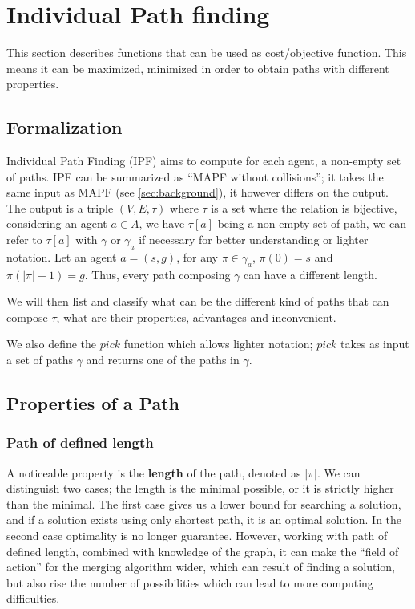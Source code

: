 
\section{Individual Path finding}\label{sec:ipf}
This section describes functions that can be used as cost/objective function. This means it can be maximized, minimized in order to obtain paths with different properties.

\subsection{Formalization}

Individual Path Finding (IPF) aims to compute for each agent, a non-empty set of paths. IPF can be summarized as ``MAPF without collisions''; it takes the same input as MAPF (see \ref{sec:background}), it however differs on the output. The output is a triple \((V,E,\tau)\) where \(\tau\) is a set where the relation is bijective, considering an agent \(a \in A\), we have  \(\tau[a]\) being a non-empty set of path, we can refer to \(\tau[a]\) with \(\gamma\) or \(\gamma_a\) if necessary for better understanding or lighter notation. Let an agent \(a=(s,g)\), for any \(\pi\in \gamma_a\), \(\pi(0) = s\) and \(\pi(|\pi|-1) = g\). Thus, every path composing \(\gamma\) can have a different length.


We will then list and classify what can be the different kind of paths that can compose \(\tau\), what are their properties, advantages and inconvenient.


We also define the \(pick\) function which allows lighter notation; \(pick\) takes as input a set of paths \(\gamma\) and returns one of the paths in \(\gamma\).




\subsection{Properties of a Path}

\subsubsection{Path of defined length}
A noticeable property is the \textbf{length} of the path, denoted as \(|\pi|\). We can distinguish two cases; the length is the minimal possible, or it is strictly higher than the minimal. The first case gives us a lower bound for searching a solution, and if a solution exists using only shortest path, it is an optimal solution. In the second case optimality is no longer guarantee. However, working with path of defined length, combined with knowledge of the graph, it can make the ``field of action'' for the merging algorithm wider, which can result of finding a solution, but also rise the number of possibilities which can lead to more computing difficulties.


